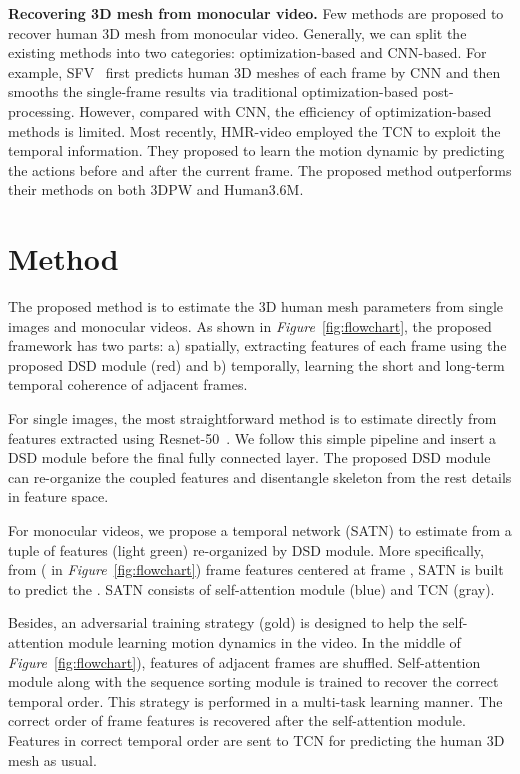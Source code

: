 \documentclass[10pt,twocolumn,letterpaper]{article}
\begin{document}
\textbf{Recovering 3D mesh from monocular video.} 
Few methods are proposed to recover human 3D mesh from monocular video. Generally, we can split the existing methods into two categories: optimization-based and CNN-based. For example, SFV~\cite{peng2018sfv} first predicts human 3D meshes of each frame by CNN and then smooths the single-frame results via traditional optimization-based post-processing. However, compared with CNN, the efficiency of optimization-based methods is limited. Most recently, HMR-video \cite{kanazawa2018learning} employed the TCN to exploit the temporal information. They proposed to learn the motion dynamic by predicting the actions before and after the current frame. The proposed method outperforms their methods on both 3DPW and Human3.6M.



\section{Method}
\label{sec:method}
The proposed method is to estimate the 3D human mesh parameters  from single images and monocular videos. 
As shown in \textit{Figure}~\ref{fig:flowchart}, the proposed framework has two parts: a) spatially, extracting features of each frame using the proposed DSD module (red) and b) temporally, learning the short and long-term temporal coherence of adjacent frames. 

For single images, the most straightforward method is to estimate  directly from features extracted using Resnet-50~\cite{resnet}. We follow this simple pipeline and insert a DSD module before the final fully connected layer. The proposed DSD module can re-organize the coupled features and disentangle skeleton from the rest details in feature space. 

For monocular videos, we propose a temporal network (SATN) to estimate  from a tuple of features (light green) re-organized by DSD module. More specifically, from  ( in \textit{Figure}~\ref{fig:flowchart}) frame features centered at frame , SATN is built to predict the . SATN consists of self-attention module (blue) and TCN (gray). 

Besides, an adversarial training strategy (gold) is designed to help the self-attention module learning motion dynamics in the video. In the middle of \textit{Figure}~\ref{fig:flowchart}), features of adjacent frames are shuffled. Self-attention module along with the sequence sorting module is trained to recover the correct temporal order. This strategy is performed in a multi-task learning manner. The correct order of frame features is recovered after the self-attention module. Features in correct temporal order are sent to TCN for predicting the human 3D mesh  as usual. 
\end{document}
